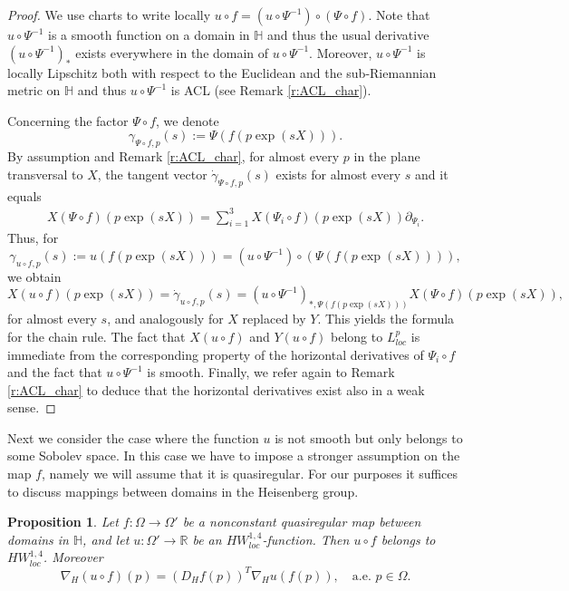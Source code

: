 \documentclass[10pt,letterpaper]{amsart}
\newtheorem{prop}[thm]{Proposition}
\theoremstyle{definition}
\numberwithin{thm}{subsection}
\numberwithin{equation}{section}
\begin{document}
\begin{proof}
We use charts to write locally $u\circ f= (u \circ \Psi^{-1})\circ (\Psi\circ f)$.
Note that $u\circ \Psi^{-1}$ is a smooth function on a domain in
${\mathbb H}$ and thus the usual derivative $(u\circ
\Psi^{-1})_{\ast}$ exists everywhere in the domain of $u\circ
\Psi^{-1}$. Moreover, $u\circ \Psi^{-1}$ is locally Lipschitz both with respect to
the Euclidean and the sub-Riemannian metric on ${\mathbb H}$ and
thus $u\circ \Psi^{-1}$ is ACL (see Remark \ref{r:ACL_char}).

Concerning the factor $\Psi\circ f$, we denote
\begin{displaymath}
 \gamma_{\Psi \circ f,p}(s):= \Psi(f(p \exp(sX))).
\end{displaymath}
By assumption and Remark \ref{r:ACL_char}, for almost every $p$ in
the plane transversal to $X$, the tangent vector $
\dot{\gamma}_{\Psi \circ f,p}(s)$ exists for almost every $s$ and
it equals
\begin{align*}
X(\Psi \circ f)(p\exp(sX))= \sum_{i=1}^3 X(\Psi_i \circ
f)(p\exp(sX))
\partial_{\Psi_i}.
\end{align*}
Thus, for
\begin{displaymath}
 \gamma_{u\circ f,p}(s):= u(f(p \exp(sX)))= (u\circ \Psi^{-1})\circ (\Psi(f(p\exp (sX)))),
\end{displaymath}
we obtain
\begin{displaymath}
 X(u\circ f)(p \exp(sX))=\dot{\gamma}_{u\circ f,p}(s) =(u\circ \Psi^{-1})_{\ast,\Psi(f(p\exp(sX)))} X(\Psi \circ f)(p\exp(sX)),
\end{displaymath}
for almost every $s$, and analogously for $X$ replaced by $Y$.
This yields the formula for the chain rule. The fact that
$X(u\circ f)$ and $Y(u\circ f)$   belong to $L_{loc}^p$ is
immediate from the corresponding property of the horizontal
derivatives of $\Psi_i \circ f$ and the fact that $u\circ
\Psi^{-1}$ is smooth. Finally, we refer again to Remark
\ref{r:ACL_char} to deduce that the horizontal derivatives exist
also in a weak sense.
\end{proof}

Next we consider the case where the function $u$ is not smooth but only belongs to some Sobolev space. In this case we have to impose a stronger assumption on the map $f$, namely we will assume that it is quasiregular. For our purposes it suffices to discuss mappings between domains in the Heisenberg group.

\begin{prop}\label{p:chainQRHeis}
Let $f:\Omega \to \Omega'$ be a nonconstant quasiregular map between domains in ${\mathbb H}$, and let $u:\Omega' \to \mathbb{R}$ be an $HW_{loc}^{1,4}$-function. Then $u\circ f$ belongs to $HW_{loc}^{1,4}$. Moreover
\begin{displaymath}
\nabla_H (u\circ f)(p) = \left(D_H f(p)\right)^T \nabla_H u(f(p)),\quad\text{a.e. }p\in \Omega.
\end{displaymath}
\end{prop}
\end{document}
